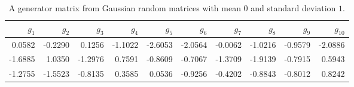 \documentclass{sig-alternate}
\begin{document}

\begin{table}[ht]
\caption{A generator matrix from Gaussian random matrices
with mean $0$ and standard deviation $1$.}
\begin{center}
\begin{tabular}{|r|r|r|r|r|r|r|r|r|r|}
\hline
$g_1$ & $g_2$ & $g_3$ & $g_4$ & $g_5$ & $g_6$ & $g_7$ & $g_8$ & $g_9$ &$g_{10}$ \\
\hline
0.0582    & -0.2290   & 0.1256     & -1.1022  & -2.6053  & -2.0564   & -0.0062   & -1.0216  & -0.9579   & -2.0886  \\
-1.6885   & 1.0350    & -1.2976    & 0.7591   & -0.8609  & -0.7067   & -1.3709   & -1.9139  & -0.7915   & 0.5943   \\
-1.2755   & -1.5523   & -0.8135    & 0.3585   & 0.0536   & -0.9256   & -0.4202   & -0.8843  & -0.8012   & 0.8242   \\
\hline
\end{tabular}
\end{center}
\end{table}
\end{document}
